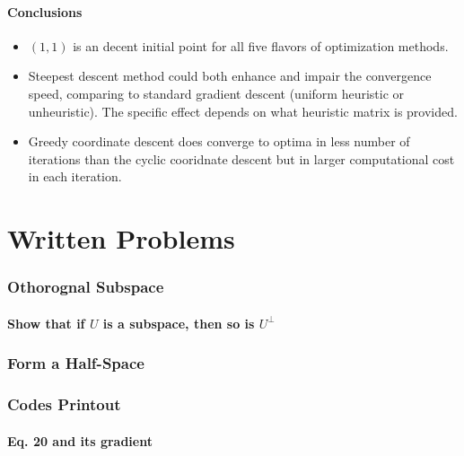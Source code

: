 \documentclass[11pt,a4paper]{article}
\begin{document}
\newpage
\subsection{Conclusions}
\begin{itemize}
    \item $(1, 1)$ is an decent initial point for all five
        flavors of optimization methods.
    \item Steepest descent method could both enhance and impair the convergence
        speed, comparing to standard gradient descent (uniform heuristic or
        unheuristic). The specific effect depends on what heuristic matrix is provided. 
    \item Greedy coordinate descent does converge to optima in less number of
        iterations than the cyclic cooridnate descent but in larger
        computational cost in each iteration.
\end{itemize}

\newpage
\part{Written Problems}
\setcounter{section}{0}
\renewcommand{\thesubsection}{(\alph{subsection})}
\section{Othorognal Subspace}
\newcommand{\Ut}{U^{\perp}}
\newcommand{\ut}{u^{\perp}}
\newcommand{\Wt}{W^{\perp}}
\newcommand{\Xt}{X^{\perp}}
\subsection{Show that if $U$ is a subspace, then so is $\Ut$}


\newpage
\setcounter{section}{6}
\section{Form a Half-Space}

\newpage
\appendix
\section{Codes Printout}

\subsection{Eq. 20 and its gradient}


\end{document}

